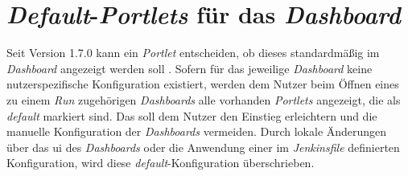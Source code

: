 \section{\textit{Default}-\textit{Portlets} für das \textit{Dashboard}}
\label{chap:default}

Seit Version 1.7.0 kann ein \textit{Portlet} entscheiden, ob dieses standardmäßig im \textit{Dashboard} angezeigt werden soll \citep{pull-request-monitoring-plugin}. Sofern für das jeweilige \textit{Dashboard} keine nutzerspezifische Konfiguration existiert, werden dem Nutzer beim Öffnen eines zu einem \textit{Run} zugehörigen \textit{Dashboards} alle vorhanden \textit{Portlets} angezeigt, die als \textit{default} markiert sind. Das soll dem Nutzer den Einstieg erleichtern und die manuelle Konfiguration der \textit{Dashboards} vermeiden. Durch lokale Änderungen über das \ac{ui} des \textit{Dashboards} oder die Anwendung einer im \textit{Jenkinsfile} definierten Konfiguration, wird diese \textit{default}-Konfiguration überschrieben. 

